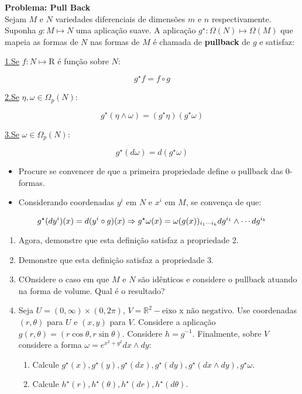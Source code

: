 \begin{framed}
\textbf{Problema: \textbf{Pull Back}}\\
Sejam $M$ e $N$ variedades diferenciais de dimensões $m$ e $n$ respectivamente. Suponha $g: M\mapsto N$ uma aplicação suave. A aplicação $g^\star: \Omega(N) \mapsto \Omega(M)$ que mapeia as formas de $N$ nas formas de $M$ é chamada de \textbf{pullback} de $g$ e satisfaz:

\href{http://1.Se}{1.Se} $f: N \mapsto \mathrm{R}$ é função sobre $N$:

\begin{equation}
g^\star f = f \circ g
\end{equation}

\href{http://2.Se}{2.Se} $\eta, \omega \in \Omega_p(N)$:

\begin{equation}
g^\star (\eta \wedge \omega) = (g^\star \eta) (g^\star \omega)
\end{equation}

\href{http://3.Se}{3.Se} $\omega \in \Omega_p(N)$:

\begin{equation}
g^\star (d\omega) = d(g^\star \omega)
\end{equation}

\begin{itemize}
\item Procure se convencer de que a primeira propriedade define o pullback das 0-formas.


\item Considerando coordenadas $y^i$ em $N$ e $x^i$ em $M$, se convença de que:
\end{itemize}

\begin{equation}
g^\star (dy^i) (x) = d(y^i\circ g)(x) \Rightarrow \\
g^\star \omega(x) = \omega(g(x))_{i_1\cdots i_k} dg^{i_1}\wedge \cdots dg^{i_k}
\end{equation}

\begin{enumerate}
\item Agora, demonstre que esta definição satisfaz a propriedade 2.
\item Demonstre que esta definição satisfaz a propriedade 3.
\item COnsidere o caso em que $M$ e $N$ são idênticos e considere o pullback atuando na forma de volume. Qual é o resultado?
\item Seja $U = (0, \infty) \times (0, 2\pi)$, $V=\mathbb{R}^2 -{\textrm{eixo x não negativo}}$. Use coordenadas $(r, \theta)$ para $U$ e $(x, y)$ para $V$. Considere a aplicação $g(r, \theta) = (r\cos\theta, r\sin\theta)$. Considere $h=g^{ -1}$. Finalmente, sobre $V$ considere a forma $\omega = e^{x^2 + y^2} dx \wedge dy$:\begin{enumerate}
\item Calcule $g^\star(x), g^\star(y), g^\star(dx), g^\star(dy), g^\star(dx \wedge dy), g^\star \omega$.
\item Calcule $h^\star(r), h^\star(\theta), h^\star(dr), h^\star(d\theta)$.
\end{enumerate}
\end{enumerate}
\end{framed}
